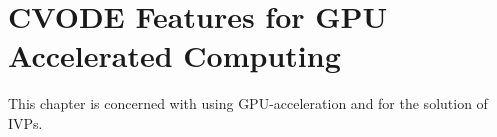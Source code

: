\chapter{CVODE Features for GPU Accelerated Computing}\label{s:cvgpu}

This chapter is concerned with using GPU-acceleration and {\cvode} for the solution
of IVPs.



